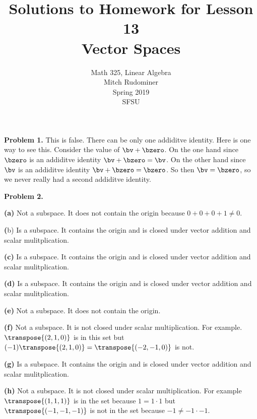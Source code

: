 \documentclass[oneside,12pt]{amsart}
\begin{document}
\title{Solutions to Homework for Lesson 13 \\ Vector Spaces}
\author{Math 325, Linear Algebra \\ Mitch Rudominer \\ Spring 2019 \\ SFSU }
\date{}

\maketitle


\textbf{Problem 1.}  This is false. There can be only one addiditve identity. Here
is one way to see this. Consider the value of $\bv + \bzero$. On the one
hand since $\bzero$ is an addiditve identity $\bv + \bzero = \bv$.
On the other hand since $\bv$ is an addiditve identity $\bv + \bzero = \bzero$.
So then $\bv=\bzero$, so we never really had a second addiditve identity.

\medskip

\textbf{Problem 2.}

\smallskip

\textbf{(a)} Not a subspace. It does not contain the origin because
$0+0+0+1\not=0$.

\smallskip

\textbf({b}) Is a subspace. It contains the origin and is closed under
vector addition and scalar mulitplication.

\smallskip

\textbf{(c)} Is a subspace. It contains the origin and is closed under
vector addition and scalar mulitplication.

\smallskip

\textbf{(d)} Is a subspace. It contains the origin and is closed under
vector addition and scalar mulitplication.

\smallskip

\textbf{(e)} Not a subspace. It does not contain the origin.

\smallskip

\textbf{(f)} Not a subspace. It is not closed under scalar multiplication.
For example.
$\transpose{(2,1,0)}$ is in this set but $(-1)\transpose{(2,1,0)}=\transpose{(-2,-1,0)}$
is not.

\smallskip

\textbf{(g)} Is a subspace. It contains the origin and is closed under
vector addition and scalar mulitplication.

\smallskip

\textbf{(h)} Not a subspace. It is not closed under scalar multiplication.
For example $\transpose{(1,1,1)}$ is in the set because $1=1\cdot1$ but
$\transpose{(-1,-1,-1)}$ is not in the set because $-1\not=-1\cdot -1$.
\end{document}
